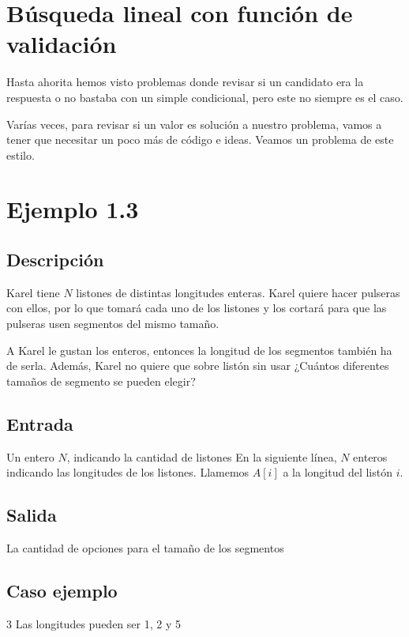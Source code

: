 \section* {Búsqueda lineal con función de validación}

Hasta ahorita hemos visto problemas donde revisar si un candidato era la respuesta o no bastaba con un simple condicional, pero este no siempre es el caso.

Varías veces, para revisar si un valor es solución a nuestro problema, vamos a tener que necesitar un poco más de código e ideas. Veamos un problema de este estilo.

\section*{Ejemplo 1.3}

\subsection*{Descripción}
Karel tiene \(N\) listones de distintas longitudes enteras. Karel quiere hacer pulseras con ellos, por lo que tomará cada uno de los listones y los cortará para que las pulseras usen segmentos del mismo tamaño.

A Karel le gustan los enteros, entonces la longitud de los segmentos también ha de serla. Además, Karel no quiere que sobre listón sin usar ¿Cuántos diferentes tamaños de segmento se pueden elegir?

\subsection*{Entrada}
Un entero \(N\), indicando la cantidad de listones
En la siguiente línea, \(N\) enteros indicando las longitudes de los listones. Llamemos \(A[i]\) a la longitud del listón \(i\).

\subsection*{Salida}
La cantidad de opciones para el tamaño de los segmentos

\subsection*{Caso ejemplo}
\begin{casebox3}
			{3}
			{Las longitudes pueden ser 1, 2 y 5}
\end{casebox3}	
